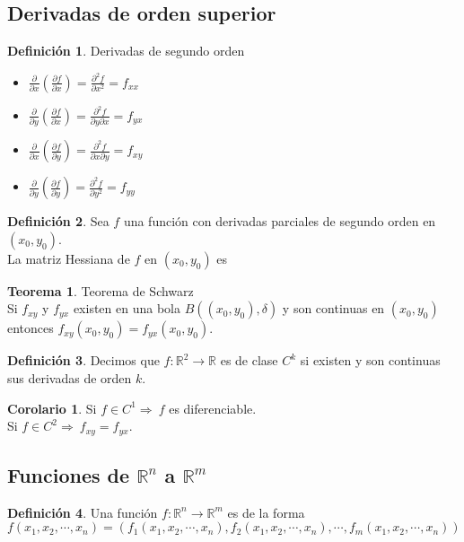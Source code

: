 \documentclass[10pt]{article}
\theoremstyle{definition}
\newtheorem{definition}{Definición}[section]
\newtheorem{theorem}{Teorema}[section]
\newtheorem{corollary}{Corolario}[theorem]
\begin{document}
\subsection{Derivadas de orden superior}
\begin{definition}{Derivadas de segundo orden}
\begin{itemize}
    \item $\frac{\partial}{\partial x}(\frac{\partial f}{\partial x})=\frac{\partial^2 f}{\partial x^2}=f_{xx}$
    \item $\frac{\partial}{\partial y}(\frac{\partial f}{\partial x})=\frac{\partial^2 f}{\partial y\partial x}=f_{yx}$
    \item $\frac{\partial}{\partial x}(\frac{\partial f}{\partial y})=\frac{\partial^2 f}{\partial x\partial y}=f_{xy}$
    \item $\frac{\partial}{\partial y}(\frac{\partial f}{\partial y})=\frac{\partial^2 f}{\partial y^2}=f_{yy}$
\end{itemize}
\end{definition}
\begin{definition}
    Sea $f$ una función con derivadas parciales de segundo orden en $(x_0,y_0)$.
    \\La matriz Hessiana de $f$ en $(x_0,y_0)$ es 
\end{definition}
\begin{theorem}{Teorema de Schwarz}
    \\Si $f_{xy}$ y $f_{yx}$ existen en una bola $B((x_0,y_0),\delta)$ y son continuas en $(x_0,y_0)$ entonces $f_{xy}(x_0,y_0)=f_{yx}(x_0,y_0)$.
\end{theorem}
\begin{definition}
    Decimos que $f:\mathbb{R}^2\to\mathbb{R}$ es de clase $C^k$ si existen y son continuas sus derivadas de orden $k$.
\end{definition}
\begin{corollary}
    Si $f\in C^1\Rightarrow\ f$ es diferenciable.\\
    Si $f\in C^2\Rightarrow\ f_{xy}=f_{yx}$.
\end{corollary}
\newpage\subsection{Funciones de $\mathbb{R}^n$ a $\mathbb{R}^m$}
\begin{definition}
    Una función $f:\mathbb{R}^n\to\mathbb{R}^m$ es de la forma $$f(x_1,x_2,\cdots,x_n)=(f_1(x_1,x_2,\cdots,x_n),f_2(x_1,x_2,\cdots,x_n),\cdots,f_m(x_1,x_2,\cdots,x_n))$$
\end{definition}
\end{document}

